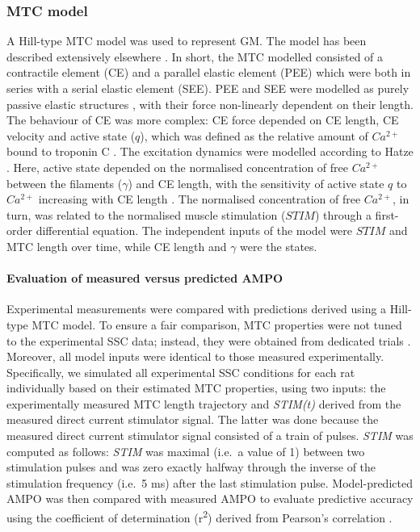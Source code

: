 \documentclass[
  10pt,
  letterpaper,
]{article}
\begin{document}
\subsubsection{MTC model}\label{mtc-model}

A Hill-type MTC model was used to represent GM. The model has been
described extensively elsewhere
\citep{reuvers_accuracy_2025, van_soest_contribution_1993}. In short,
the MTC modelled consisted of a contractile element (CE) and a parallel
elastic element (PEE) which were both in series with a serial elastic
element (SEE). PEE and SEE were modelled as purely passive elastic
structures \citep{zajac_muscle_1989}, with their force non-linearly
dependent on their length. The behaviour of CE was more complex: CE
force depended on CE length, CE velocity and active state (\(q\)), which
was defined as the relative amount of \(Ca^{2+}\) bound to troponin C
\citep{ebashi_calcium_1968}. The excitation dynamics were modelled
according to {Hatze \citep[pp 31-32]{hatze_myocybernetic_1981}}. Here,
active state depended on the normalised concentration of free
\(Ca^{2+}\) between the filaments (\(\gamma\)) and CE length, with the
sensitivity of active state \(q\) to \(Ca^{2+}\) increasing with CE
length \citep[e.g.][]{rack_effects_1969, stephenson_effects_1982}. The
normalised concentration of free \(Ca^{2+}\), in turn, was related to
the normalised muscle stimulation (\(STIM\)) through a first-order
differential equation. The independent inputs of the model were \(STIM\)
and MTC length over time, while CE length and \(\gamma\) were the
states.

\paragraph{Evaluation of measured versus predicted
AMPO}\label{evaluation-of-measured-versus-predicted-ampo}

Experimental measurements were compared with predictions derived using a
Hill-type MTC model. To ensure a fair comparison, MTC properties were
not tuned to the experimental SSC data; instead, they were obtained from
dedicated trials \citep[see][]{reuvers_accuracy_2025}. Moreover, all
model inputs were identical to those measured experimentally.
Specifically, we simulated all experimental SSC conditions for each rat
individually based on their estimated MTC properties, using two inputs:
the experimentally measured MTC length trajectory and \emph{STIM(t)}
derived from the measured direct current stimulator signal. The latter
was done because the measured direct current stimulator signal consisted
of a train of pulses. \emph{STIM} was computed as follows: \emph{STIM}
was maximal (i.e.~a value of 1) between two stimulation pulses and was
zero exactly halfway through the inverse of the stimulation frequency
(i.e.~5 ms) after the last stimulation pulse. Model-predicted AMPO was
then compared with measured AMPO to evaluate predictive accuracy using
the coefficient of determination (r\textsuperscript{2}) derived from
Pearson's correlation \citep{pearson_vii_1896}.
\end{document}
